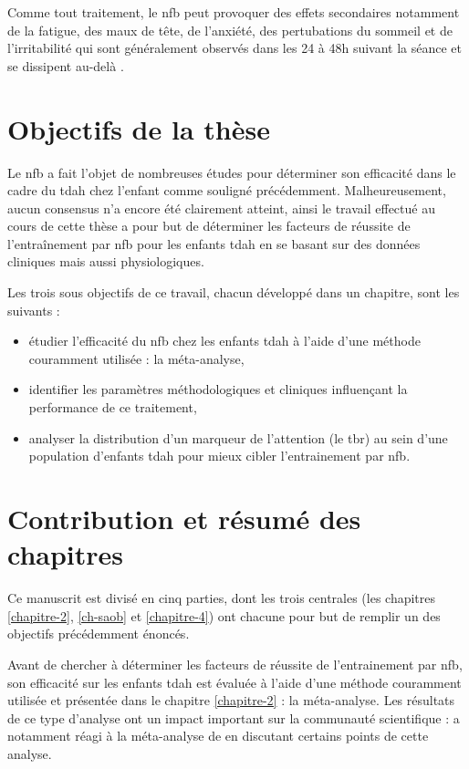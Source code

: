 Comme tout traitement, le \gls{nfb} peut provoquer des effets secondaires notamment de la fatigue, des maux de tête, de l'anxiété, des pertubations du sommeil et de l'irritabilité qui
sont généralement observés dans les 24 à 48h suivant la séance et se dissipent au-delà \citep{Hammond2007}. 


\section{Objectifs de la thèse}

Le \gls{nfb} a fait l'objet de nombreuses études pour déterminer son efficacité dans le cadre du \gls{tdah} chez l'enfant comme souligné précédemment.
Malheureusement, aucun consensus n'a encore été clairement atteint, ainsi le travail effectué au cours de cette thèse a pour but de déterminer les facteurs 
de réussite de l'entraînement par \gls{nfb} pour les enfants \gls{tdah} en se basant sur des données cliniques mais aussi physiologiques. 

Les trois sous objectifs de ce travail, chacun développé dans un chapitre, sont les suivants :
\begin{itemize}
\item étudier l'efficacité du \gls{nfb} chez les enfants \gls{tdah} à l'aide d'une méthode couramment utilisée : la méta-analyse,
\item identifier les paramètres méthodologiques et cliniques influençant la performance de ce traitement,
\item analyser la distribution d'un marqueur de l'attention (le \gls{tbr}) au sein d'une population d'enfants \gls{tdah} pour mieux cibler
l'entrainement par \gls{nfb}. 
\end{itemize}

\section{Contribution et résumé des chapitres}

Ce manuscrit est divisé en cinq parties, dont les trois centrales (les chapitres \ref{chapitre-2}, \ref{ch-saob} et \ref{chapitre-4}) ont chacune pour but de remplir 
un des objectifs précédemment énoncés.

Avant de chercher à déterminer les facteurs de réussite de l'entrainement par \gls{nfb}, son efficacité sur les enfants \gls{tdah} est évaluée à l'aide 
d'une méthode couramment utilisée \citep{Sonuga-Barke2013, Micoulaud2014, Cortese2016} et présentée dans le chapitre \ref{chapitre-2} : la méta-analyse. 
Les résultats de ce type d'analyse ont un impact important sur la communauté scientifique : \citet{Micoulaud2016} a notamment réagi à la méta-analyse de 
\citet{Cortese2016} en discutant certains points de cette analyse. 

